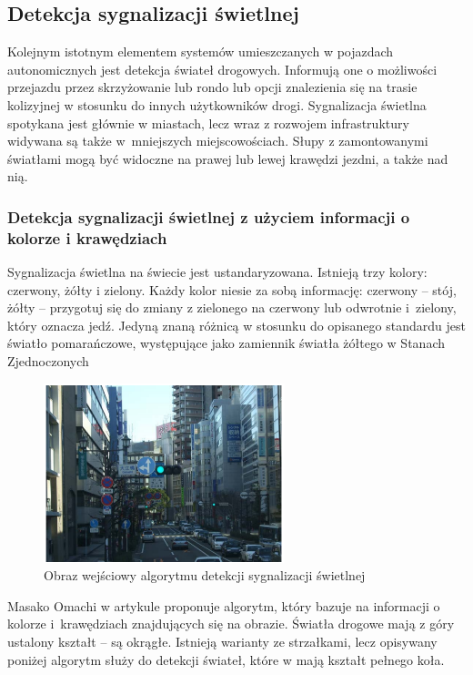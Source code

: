 \subsection{Detekcja sygnalizacji świetlnej}
\label{sec:tl}
Kolejnym istotnym elementem systemów umieszczanych w pojazdach autonomicznych jest detekcja świateł drogowych.
Informują one o możliwości przejazdu przez skrzyżowanie lub rondo lub opcji znalezienia się na trasie kolizyjnej w stosunku do innych użytkowników drogi. %
Sygnalizacja świetlna spotykana jest głównie w miastach, lecz wraz z rozwojem infrastruktury widywana są także w~mniejszych miejscowościach. 
Słupy z zamontowanymi światłami mogą być widoczne na prawej lub lewej krawędzi jezdni, a także nad nią.

\subsubsection{Detekcja sygnalizacji świetlnej z użyciem informacji o kolorze i krawędziach}

Sygnalizacja świetlna na świecie jest ustandaryzowana. %
Istnieją trzy kolory: czerwony, żółty i zielony. 
Każdy kolor niesie za sobą informację: czerwony -- stój, żółty -- przygotuj się do zmiany z zielonego na czerwony lub odwrotnie i~zielony, który oznacza jedź. 
Jedyną znaną różnicą w stosunku do opisanego standardu jest światło pomarańczowe, występujące jako zamiennik światła żółtego w Stanach Zjednoczonych %

\begin{figure}
  \centering
  \includegraphics[width=7cm]{img/tl_input.png}
  \caption{Obraz wejściowy algorytmu detekcji sygnalizacji świetlnej\cite{T4}}
  \label{fig:tl_input}
\end{figure}

Masako Omachi w artykule \cite{T4} proponuje algorytm, który bazuje na informacji o kolorze i~krawędziach znajdujących się na obrazie. 
Światła drogowe mają z góry ustalony kształt -- są okrągłe. 
Istnieją warianty ze strzałkami, lecz opisywany poniżej algorytm służy do detekcji świateł, które w \cite{Kodeks} mają kształt pełnego koła.


